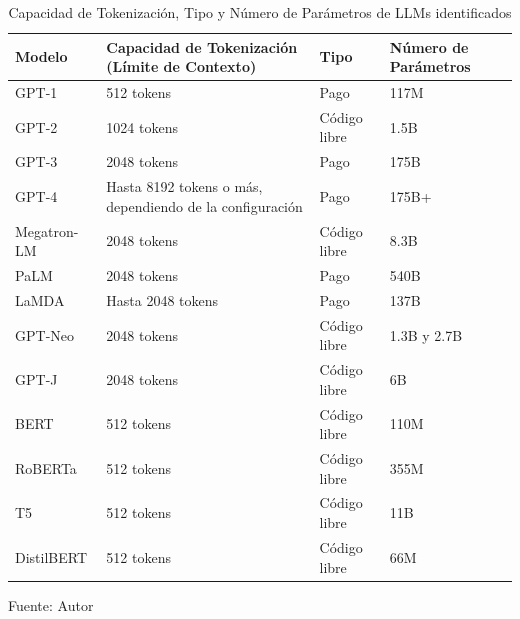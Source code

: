 \documentclass[journal,onecolumn]{IEEEtran}
\begin{document}
\begin{table}[h!]
	\centering
	\begin{tabular}{|l|l|l|l|}
		\hline
		\textbf{Modelo} & \textbf{Capacidad de Tokenización (Límite de Contexto)} & \textbf{Tipo}       & \textbf{Número de Parámetros} \\ \hline
		GPT-1           & 512 tokens                                              & Pago                & 117M                         \\ \hline
		GPT-2           & 1024 tokens                                             & Código libre        & 1.5B                         \\ \hline
		GPT-3           & 2048 tokens                                             & Pago                & 175B                         \\ \hline
		GPT-4           & Hasta 8192 tokens o más, dependiendo de la configuración & Pago                & 175B+                        \\ \hline
		Megatron-LM     & 2048 tokens                                             & Código libre        & 8.3B                         \\ \hline
		PaLM            & 2048 tokens                                             & Pago                & 540B                         \\ \hline
		LaMDA           & Hasta 2048 tokens                                       & Pago                & 137B                         \\ \hline
		GPT-Neo         & 2048 tokens                                             & Código libre        &1.3B y 2.7B                         \\ \hline
		GPT-J           & 2048 tokens                                             & Código libre        & 6B                           \\ \hline
		BERT            & 512 tokens                                              & Código libre        & 110M                         \\ \hline
		RoBERTa         & 512 tokens                                              & Código libre        & 355M                         \\ \hline
		T5              & 512 tokens                                              & Código libre        & 11B                          \\ \hline
		DistilBERT      & 512 tokens                                              & Código libre        & 66M                          \\ \hline
	\end{tabular}
	\caption{Capacidad de Tokenización, Tipo y Número de Parámetros de LLMs identificados}
	\label{tab:tokenization}
	Fuente: Autor
\end{table}
\end{document}
